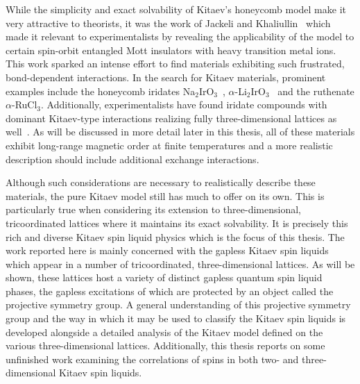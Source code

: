While the simplicity and exact solvability of Kitaev's honeycomb model make it very attractive to theorists, it was the work of Jackeli and Khaliullin~\cite{JackeliPRL2009} which made it relevant to experimentalists by revealing the applicability of the model to certain spin-orbit entangled Mott insulators with heavy transition metal ions.
This work sparked an intense effort to find materials exhibiting such frustrated, bond-dependent interactions.
In the search for Kitaev materials, prominent examples include the honeycomb iridates Na$_2$IrO$_3$~\cite{SinghPRB2010}, $\alpha$-Li$_2$IrO$_3$~\cite{KobayashiJMC2003,SinghPRL2012} and the ruthenate $\alpha$-RuCl$_3$.
Additionally, experimentalists have found iridate compounds with dominant Kitaev-type interactions realizing fully three-dimensional lattices as well~\cite{TakayamaPRL2015,LeePRB2015,KimEPL2015,LeePRB2016,KatukuriSP2016,ModicNatComm2014,BiffinPRL2014,KimchiPRB2014}.
As will be discussed in more detail later in this thesis, all of these materials exhibit long-range magnetic order at finite temperatures and a more realistic description should include additional exchange interactions.

Although such considerations are necessary to realistically describe these materials, the pure Kitaev model still has much to offer on its own.
This is particularly true when considering its extension to three-dimensional, tricoordinated lattices where it maintains its exact solvability.
It is precisely this rich and diverse Kitaev spin liquid physics which is the focus of this thesis.
The work reported here is mainly concerned with the gapless Kitaev spin liquids which appear in a number of tricoordinated, three-dimensional lattices.
As will be shown, these lattices host a variety of distinct gapless quantum spin liquid phases, the gapless excitations of which are protected by an object called the projective symmetry group.
A general understanding of this projective symmetry group and the way in which it may be used to classify the Kitaev spin liquids is developed alongside a detailed analysis of the Kitaev model defined on the various three-dimensional lattices.
Additionally, this thesis reports on some unfinished work examining the correlations of spins in both two- and three-dimensional Kitaev spin liquids.

